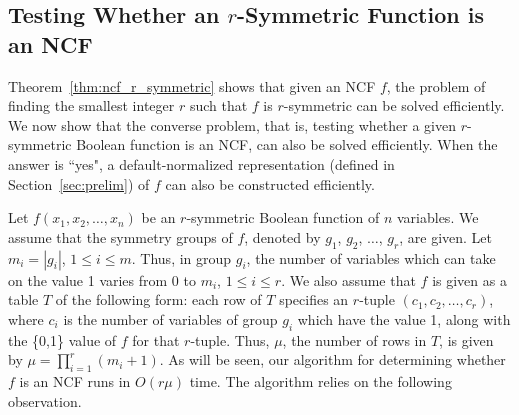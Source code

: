 \subsection{Testing Whether an $r$-Symmetric Function is an NCF}
\label{sse:rsym_to_ncf}

Theorem~\ref{thm:ncf_r_symmetric} shows that given an NCF $f$,
the problem of finding the smallest integer $r$ such that
$f$ is $r$-symmetric can be solved efficiently.
We now show that the converse problem, that is, testing whether a given
$r$-symmetric Boolean function is an NCF,
can also be solved efficiently.
When the answer is ``yes", a
default-normalized representation (defined in Section~\ref{sec:prelim})
of $f$ can also be constructed efficiently.

Let $f(x_1, x_2, \ldots, x_n)$ be an $r$-symmetric 
Boolean function of $n$ variables.
We assume that the symmetry groups 
of $f$, denoted by $g_1$, $g_2$, $\ldots$, $g_r$,
are given.
Let $m_i = |g_i|$, $1 \leq i \leq m$.
Thus, in group $g_i$, the number
of variables which can take on the value 1 varies from 0
to $m_i$, $1 \leq i \leq r$.
We also assume that $f$ is
given as a table $T$ of the following form:
each row of $T$ specifies an $r$-tuple $(c_1, c_2, \ldots, c_r)$,
where $c_i$ is the number of variables of group $g_i$ which
have the value 1, along with the \{0,1\} value of $f$ for that $r$-tuple.
Thus, $\mu$, the number of rows in $T$, 
is given by  $\mu = \prod_{i=1}^r (m_i+1)$.
As will be seen, our algorithm for determining whether $f$ is
an NCF runs in $O(r\mu)$ time.
The algorithm relies on the following observation.

